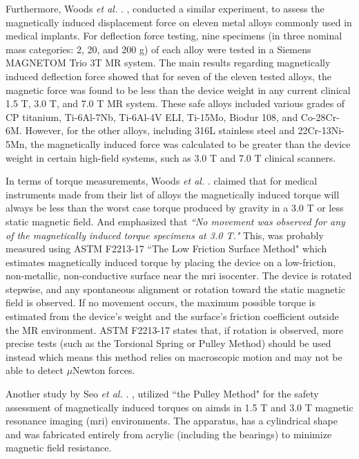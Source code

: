 Furthermore, Woods \textit{et al.} . \cite{Woods2021_MRIdisplacement}, conducted a similar experiment, to assess the magnetically induced displacement force on eleven metal alloys commonly used in medical implants. For deflection force testing, nine specimens (in three nominal mass categories: 2, 20, and 200 g) of each alloy were tested in a Siemens MAGNETOM Trio 3T MR system. 
The main results regarding magnetically induced deflection force showed that for seven of the eleven tested alloys, the magnetic force was found to be less than the device weight in any current clinical 1.5 T, 3.0 T, and 7.0 T MR system. These safe alloys included various grades of CP titanium, Ti-6Al-7Nb, Ti-6Al-4V ELI, Ti-15Mo, Biodur 108, and Co-28Cr-6M. However, for the other alloys, including 316L stainless steel and 22Cr-13Ni-5Mn, the magnetically induced force was calculated to be greater than the device weight in certain high-field systems, such as 3.0 T and 7.0 T clinical scanners.

In terms of torque measurements, Woods \textit{et al.} . \cite{Woods2021_MRIdisplacement} claimed that for medical instruments made from their list of alloys the magnetically induced torque will always be less than the worst case torque produced by gravity in a 3.0 T or less static magnetic field. And emphasized that \textit{``No movement was observed for any of the magnetically induced torque specimens at 3.0 T."} This, was probably measured using ASTM F2213-17 \cite{astm2213} ``The Low Friction Surface Method" which estimates magnetically induced torque by placing the device on a low-friction, non-metallic, non-conductive surface near the \gls{mri} isocenter. The device is rotated stepwise, and any spontaneous alignment or rotation toward the static magnetic field is observed. If no movement occurs, the maximum possible torque is estimated from the device’s weight and the surface’s friction coefficient outside the MR environment. ASTM F2213-17 states that, if rotation is observed, more precise tests (such as the Torsional Spring or Pulley Method) should be used instead which means this method relies on macroscopic motion and may not be able to detect $\mu$Newton forces.

Another study by Seo \textit{et al.} . \cite{Seo2021767}, utilized ``the Pulley Method" for the safety assessment of magnetically induced torques on \gls{aimd}s in 1.5 T and 3.0 T magnetic resonance imaging (\gls{mri}) environments. The apparatus, has a cylindrical shape and was fabricated entirely from acrylic (including the bearings) to minimize magnetic field resistance. 

